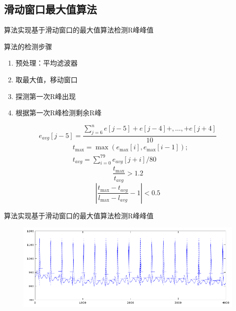 \documentclass[aspectratio=43,fleqn]{beamer}
\begin{document}
\subsection{滑动窗口最大值算法}
\begin{frame}{算法实现}{基于滑动窗口的最大值算法检测R峰峰值}
\begin{block}{算法的检测步骤}
\begin{enumerate}
	\item<1-> 预处理：平均滤波器
	\item<2-> 取最大值，移动窗口
	\item<3-> 探测第一次R峰出现
	\item<4-> 根据第一次R峰检测剩余R峰
\end{enumerate}
\end{block}
{\begin{equation*}
  {{e}_{avg}}[j-5]=\frac{\sum\limits_{j=6}^{n}{e[j-5]+e[j-4]+,\ldots ,+e[j+4]}}{10}
\end{equation*}}
{\begin{equation*}
\begin{aligned}
 & {{t}_{\max }}=\max ({{e}_{\max }}[i],{{e}_{\max }}[i-1]); \\ 
 & {{t}_{avg}}={\sum\limits_{i=0}^{79}{{{e}_{avg}}[j+i]}}/{80}\;  
\end{aligned}
\end{equation*}}
{\begin{equation*}
\frac{{{t}_{\max }}}{{{t}_{avg}}}>1.2
\end{equation*}}
{\begin{equation*}
\left| \frac{{{t}_{\max }}-{{t}_{avg}}}{{{l}_{\max }}-{{l}_{avg}}}-1 \right|<0.5
\end{equation*}}
\end{frame}

\begin{frame}{算法实现}{基于滑动窗口的最大值算法检测R峰峰值}
\begin{figure}[ht]
	\includegraphics[width=\textwidth]{fig7.png}
\end{figure}
\end{frame}
\end{document}
